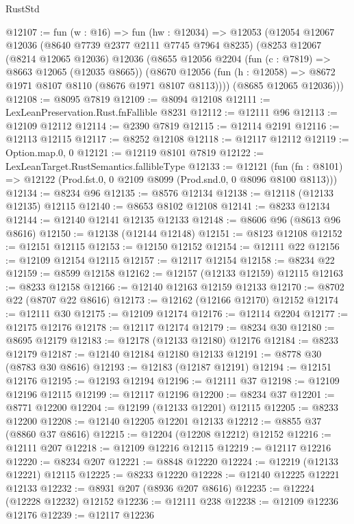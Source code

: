 \begin{lexlean}{RustStd}
\begin{coremodule}
@12107 := fun (w : @16) =>
  fun (hw : @12034) =>
  @12053
    (@12054
      @12067
      @12036
      (@8640 @7739 @2377 @2111 @7745 @7964 @8235)
      (@8253
        @12067
        (@8214 @12065 @12036)
        @12036
        (@8655
          @12056
          @2204
          (fun (c : @7819) => @8663 @12065 (@12035 @8665))
          (@8670 @12056 (fun (h : @12058) => @8672 @1971 @8107 @8110 (@8676 @1971 @8107 @8113))))
        (@8685 @12065 @12036)))
@12108 := @8095 @7819
@12109 := @8094 @12108
@12111 := LexLeanPreservation.Rust.fnFallible @8231
@12112 := @12111 @96
@12113 := @12109 @12112
@12114 := @2390 @7819
@12115 := @12114 @2191
@12116 := @12113 @12115
@12117 := @8252 @12108
@12118 := @12117 @12112
@12119 := Option.map.{0, 0}
@12121 := @12119 @8101 @7819
@12122 := LexLeanTarget.RustSemantics.fallibleType
@12133 := @12121
    (fun (fn : @8101) => @12122 (Prod.fst.{0, 0} @2109 @8099 (Prod.snd.{0, 0} @8096 @8100 @8113)))
@12134 := @8234 @96
@12135 := @8576 @12134
@12138 := @12118 (@12133 @12135) @12115
@12140 := @8653 @8102 @12108
@12141 := @8233 @12134
@12144 := @12140 @12141 @12135 @12133
@12148 := @8606 @96 (@8613 @96 @8616)
@12150 := @12138 (@12144 @12148)
@12151 := @8123 @12108
@12152 := @12151 @12115
@12153 := @12150 @12152
@12154 := @12111 @22
@12156 := @12109 @12154 @12115
@12157 := @12117 @12154
@12158 := @8234 @22
@12159 := @8599 @12158
@12162 := @12157 (@12133 @12159) @12115
@12163 := @8233 @12158
@12166 := @12140 @12163 @12159 @12133
@12170 := @8702 @22 (@8707 @22 @8616)
@12173 := @12162 (@12166 @12170) @12152
@12174 := @12111 @30
@12175 := @12109 @12174
@12176 := @12114 @2204
@12177 := @12175 @12176
@12178 := @12117 @12174
@12179 := @8234 @30
@12180 := @8695 @12179
@12183 := @12178 (@12133 @12180) @12176
@12184 := @8233 @12179
@12187 := @12140 @12184 @12180 @12133
@12191 := @8778 @30 (@8783 @30 @8616)
@12193 := @12183 (@12187 @12191)
@12194 := @12151 @12176
@12195 := @12193 @12194
@12196 := @12111 @37
@12198 := @12109 @12196 @12115
@12199 := @12117 @12196
@12200 := @8234 @37
@12201 := @8771 @12200
@12204 := @12199 (@12133 @12201) @12115
@12205 := @8233 @12200
@12208 := @12140 @12205 @12201 @12133
@12212 := @8855 @37 (@8860 @37 @8616)
@12215 := @12204 (@12208 @12212) @12152
@12216 := @12111 @207
@12218 := @12109 @12216 @12115
@12219 := @12117 @12216
@12220 := @8234 @207
@12221 := @8848 @12220
@12224 := @12219 (@12133 @12221) @12115
@12225 := @8233 @12220
@12228 := @12140 @12225 @12221 @12133
@12232 := @8931 @207 (@8936 @207 @8616)
@12235 := @12224 (@12228 @12232) @12152
@12236 := @12111 @238
@12238 := @12109 @12236 @12176
@12239 := @12117 @12236

\end{coremodule}
\end{lexlean}
